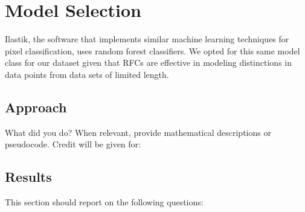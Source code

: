 \documentclass[11pt]{article}
\begin{document}
\section{Model Selection}

Ilastik, the software that implements similar machine learning techniques for pixel classification,
uses random forest classifiers. We opted for this same model class for our dataset given that RFCs
are effective in modeling distinctions in data points from data sets of limited length.

\subsection{Approach}

What did you do? When relevant, provide mathematical descriptions or pseudocode. Credit will be
given for:

\subsection{Results}

This section should report on the following questions: 
\end{document}
